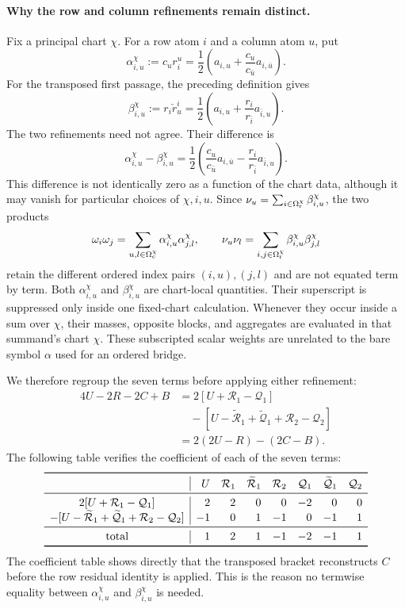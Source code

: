 \documentclass[11pt]{article}
\begin{document}
\paragraph{Why the row and column refinements remain distinct.}
Fix a principal chart $\chi$.  For a row atom $i$ and a column atom $u$, put
\[
 \alpha_{i,u}^{\chi}:=c_ur_i^u
 =\frac12\left(a_{i,u}+\frac{c_u}{c_{\bar u}}a_{i,\bar u}\right).
\]
For the transposed first passage, the preceding definition gives
\[
 \beta_{i,u}^{\chi}:=r_i\check r_u^i
 =\frac12\left(a_{i,u}+\frac{r_i}{r_{\bar i}}a_{\bar i,u}\right).
\]
The two refinements need not agree.  Their difference is
\[
 \alpha_{i,u}^{\chi}-\beta_{i,u}^{\chi}
 =\frac12\left(
 \frac{c_u}{c_{\bar u}}a_{i,\bar u}
 -\frac{r_i}{r_{\bar i}}a_{\bar i,u}
 \right).
\]
This difference is not identically zero as a function of the chart data,
although it may vanish for particular choices of $\chi,i,u$.
Since
$\nu_u=\sum_{i\in\Omega_{\rm r}^\chi}\beta_{i,u}^{\chi}$, the two products
\[
 \omega_i\omega_j
 =\sum_{u,l\in\Omega_{\rm c}^\chi}
   \alpha_{i,u}^{\chi}\alpha_{j,l}^{\chi},
 \qquad
 \nu_u\nu_l
 =\sum_{i,j\in\Omega_{\rm r}^\chi}
   \beta_{i,u}^{\chi}\beta_{j,l}^{\chi}
\]
retain the different ordered index pairs $(i,u),(j,l)$ and are not equated
term by term.
Both $\alpha_{i,u}^{\chi}$ and $\beta_{i,u}^{\chi}$ are chart-local
quantities.  Their superscript is suppressed only inside one fixed-chart
calculation.  Whenever
they occur inside a sum over $\chi$, their masses, opposite blocks, and
aggregates are evaluated in that summand's chart $\chi$.  These subscripted
scalar weights are unrelated to the bare symbol $\alpha$ used for an ordered
bridge.

We therefore regroup the seven terms before applying either refinement:
\begin{equation}\label{eq:direct-seven-source-regrouping}
\begin{aligned}
4U-2R-2C+B
&=2[U+\mathcal R_1-\mathcal Q_1]\\
&\quad-[U-\widetilde{\mathcal R}_1+
 \widetilde{\mathcal Q}_1+\mathcal R_2-\mathcal Q_2]\\
&=2(2U-R)-(2C-B).
\end{aligned}
\tag{A.29b}
\end{equation}
The following table verifies the coefficient of each of the seven terms:
\[
\begin{array}{c|rrrrrrr}
\toprule
&U&\mathcal R_1&\widetilde{\mathcal R}_1&\mathcal R_2
&\mathcal Q_1&\widetilde{\mathcal Q}_1&\mathcal Q_2\\
\midrule
2[U+\mathcal R_1-\mathcal Q_1]&2&2&0&0&-2&0&0\\
-[U-\widetilde{\mathcal R}_1+\widetilde{\mathcal Q}_1
 +\mathcal R_2-\mathcal Q_2]&-1&0&1&-1&0&-1&1\\
\midrule
\text{total}&1&2&1&-1&-2&-1&1\\
\bottomrule
\end{array}
\]
The coefficient table shows directly that the transposed bracket reconstructs
$C$ before the row residual identity is applied.  This is the reason no
termwise equality between $\alpha_{i,u}^{\chi}$ and
$\beta_{i,u}^{\chi}$ is needed.
\end{document}
